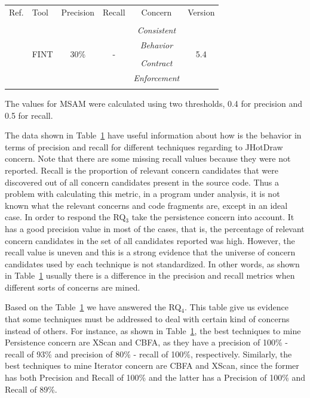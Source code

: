 \begin{table}[!t]
\begin{threeparttable}
\begin{tabular}{|c|l|c|c|c|c|}
\hline {Ref.} & {Tool} &  {Precision} & {Recall} & {Concern} & {Version} \\
\cline{1-6}
&  &  &  &  &  \\
\multirow{5}{*}{\cite{Marin:2006:CFA:1174510.1174715}}&\multirow{5}{*}{FINT}&\multirow{5}{*}{30\%}&\multirow{5}{*}{-}&\textit{Consistent} &\multirow{5}{*}{5.4}\\
&  &  &  &\textit{Behavior}&  \\
&   &&& &\\
&  &  &  &\textit{Contract}&  \\
&  &  &  &\textit{Enforcement}  &  \\
&  &  &  &  &  \\
\cline{1-6}
\hline

\end{tabular}
\begin{tablenotes}
      \scriptsize
      \item *The values for MSAM were calculated using two thresholds, 0.4 for precision and 0.5 for recall.
    \end{tablenotes}
\end{threeparttable}
\label{table_metrics}
\end{table}


The data shown in Table~\ref{table_metrics} have useful information about how is the behavior in terms of precision and recall for different techniques regarding to JHotDraw concern. Note that there are some missing recall values because they were not reported. Recall is the proportion of relevant concern candidates that were discovered out of all concern candidates present in the source code. Thus a problem with calculating this metric, in a program under analysis, it is not known what the relevant concerns and code fragments are, except in an ideal case. In order to respond the RQ$_3$ take the persistence concern into account. It has a good precision value in most of the cases, that is, the percentage of relevant concern candidates in the set of all candidates reported was high. However, the recall value is uneven and this is a strong evidence that the universe of concern candidates used by each technique is not standardized. In other words, as shown in Table~\ref{table_metrics} usually there is a difference in the precision and recall metrics when different sorts of concerns are mined.

Based on the Table~\ref{table_metrics} we have answered the RQ$_4$. This table give us evidence that some techniques must be addressed to deal with certain kind of concerns instead of others. For instance, as shown in Table~\ref{table_metrics}, the best techniques to mine Persistence concern are XScan and CBFA, as they have a precision of 100\% - recall of 93\% and precision of 80\% - recall of 100\%, respectively. Similarly, the best techniques to mine Iterator concern are CBFA and XScan, since the former has both Precision and Recall of 100\% and the latter has a Precision of 100\% and Recall of 89\%.

